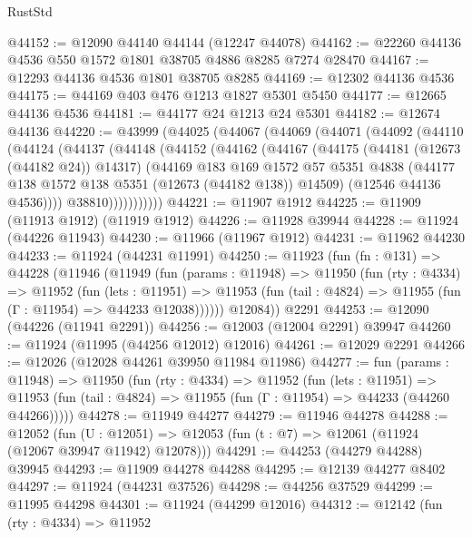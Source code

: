 \begin{lexlean}{RustStd}
\begin{coremodule}
{\begin{coremodule}
{{{{{{{{{{{{{{{{{{{{{{{{{{{{{{{{{{{{{{{{{{{{{{{{{{{{{{{{{{{{{{{{{{{{{{{{{{{{{{{{@44152 := @12090 @44140 @44144 (@12247 @44078)
@44162 := @22260 @44136 @4536 @550 @1572 @1801 @38705 @4886 @8285 @7274 @28470
@44167 := @12293 @44136 @4536 @1801 @38705 @8285
@44169 := @12302 @44136 @4536
@44175 := @44169 @403 @476 @1213 @1827 @5301 @5450
@44177 := @12665 @44136 @4536
@44181 := @44177 @24 @1213 @24 @5301
@44182 := @12674 @44136
@44220 := @43999
    (@44025
      (@44067
        (@44069
          (@44071
            (@44092
              (@44110
                (@44124
                  (@44137
                    (@44148
                      (@44152
                        (@44162
                          (@44167
                            (@44175
                              (@44181 (@12673 (@44182 @24)) @14317)
                              (@44169
                                @183
                                @169
                                @1572
                                @57
                                @5351
                                @4838
                                (@44177 @138 @1572 @138 @5351 (@12673 (@44182 @138)) @14509)
                                (@12546 @44136 @4536))))
                          @38810)))))))))))
@44221 := @11907 @1912
@44225 := @11909 (@11913 @1912) (@11919 @1912)
@44226 := @11928 @39944
@44228 := @11924 (@44226 @11943)
@44230 := @11966 (@11967 @1912)
@44231 := @11962 @44230
@44233 := @11924 (@44231 @11991)
@44250 := @11923
    (fun (fn : @131) =>
    @44228
      (@11946
        (@11949
          (fun (params : @11948) =>
          @11950
            (fun (rty : @4334) =>
            @11952
              (fun (lets : @11951) =>
              @11953 (fun (tail : @4824) => @11955 (fun (Γ : @11954) => @44233 @12038))))))
        @12084))
    @2291
@44253 := @12090 (@44226 (@11941 @2291))
@44256 := @12003 (@12004 @2291) @39947
@44260 := @11924 (@11995 (@44256 @12012) @12016)
@44261 := @12029 @2291
@44266 := @12026 (@12028 @44261 @39950 @11984 @11986)
@44277 := fun (params : @11948) =>
  @11950
    (fun (rty : @4334) =>
    @11952
      (fun (lets : @11951) =>
      @11953 (fun (tail : @4824) => @11955 (fun (Γ : @11954) => @44233 (@44260 @44266)))))
@44278 := @11949 @44277
@44279 := @11946 @44278
@44288 := @12052
    (fun (U : @12051) => @12053 (fun (t : @7) => @12061 (@11924 (@12067 @39947 @11942) @12078)))
@44291 := @44253 (@44279 @44288) @39945
@44293 := @11909 @44278 @44288
@44295 := @12139 @44277 @8402
@44297 := @11924 (@44231 @37526)
@44298 := @44256 @37529
@44299 := @11995 @44298
@44301 := @11924 (@44299 @12016)
@44312 := @12142
    (fun (rty : @4334) =>
    @11952
}}}}}}}}}}}}}}}}}}}}}}}}}}}}}}}}}}}}}}}}}}}}}}}}}}}}}}}}}}}}}}}}}}}}}}}}}}}}}}}}
\end{coremodule}}
\end{coremodule}
\end{lexlean}
